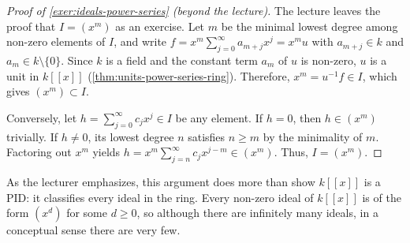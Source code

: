\begin{proofWrapper}
\begin{content}

\begin{proof}[Proof of \cref{exer:ideals-power-series} (beyond the lecture)]
The lecture leaves the proof that $I = (x^m)$ as an exercise. Let $m$ be the minimal lowest degree among non-zero elements of $I$, and write $f = x^m \sum_{j=0}^\infty a_{m+j} x^j = x^m u$ with $a_{m+j} \in k$ and $a_m \in k \setminus \{0\}$. Since $k$ is a field and the constant term $a_m$ of $u$ is non-zero, $u$ is a unit in $k[[x]]$ (\cref{thm:units-power-series-ring}). Therefore, $x^m = u^{-1} f \in I$, which gives $(x^m) \subset I$.

Conversely, let $h = \sum_{j=0}^\infty c_j x^j \in I$ be any element. If $h = 0$, then $h \in (x^m)$ trivially. If $h \neq 0$, its lowest degree $n$ satisfies $n \ge m$ by the minimality of $m$. Factoring out $x^m$ yields $h = x^m \sum_{j=n}^\infty c_j x^{j-m} \in (x^m)$. Thus, $I = (x^m)$.
\end{proof}
\end{content}

\end{proofWrapper}

\begin{insight}
As the lecturer emphasizes, this argument does more than show $k[[x]]$ is a PID: it classifies every ideal in the ring. Every non-zero ideal of $k[[x]]$ is of the form $(x^d)$ for some $d \ge 0$, so although there are infinitely many ideals, in a conceptual sense there are very few.
\end{insight}

\begin{hidden}
\end{hidden}

